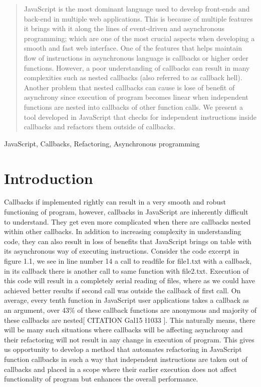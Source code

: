 \documentclass[10pt,conference]{IEEEtran}
\begin{document}
\begin{abstract}
JavaScript is the most dominant language used to develop front-ends and back-end in multiple web applications. This is because of multiple features it brings with it along the lines of event-driven and asynchronous programming; which are one of the most crucial aspects when developing a smooth and fast web interface. One of the features that helps maintain flow of instructions in asynchronous language is callbacks or higher order functions. However, a poor understanding of callbacks can result in many complexities such as nested callbacks (also referred to as callback hell). Another problem that nested callbacks can cause is lose of benefit of asynchrony since execution of program becomes linear when independent functions are nested into callbacks of other function calls. We present a tool developed in JavaScript that checks for independent instructions inside callbacks and refactors them outside of callbacks.
\end{abstract}

\begin{IEEEkeywords}
JavaScript, Callbacks, Refactoring, Asynchronous programming
\end{IEEEkeywords}

\section{Introduction}
Callbacks if implemented rightly can result in a very smooth and robust functioning of program, however, callbacks in JavaScript are inherently difficult to understand. They get even more complicated when there are callbacks nested within other callbacks. In addition to increasing complexity in understanding code, they can also result in loss of benefits that JavaScript brings on table with its asynchronous way of executing instructions. Consider the code excerpt in figure 1.1, we see in line number 14 a call to readfile for file1.txt with a callback, in its callback there is another call to same function with file2.txt. Execution of this code will result in a completely serial reading of files, where as we could have achieved better results if second call was outside the callback of first call.
On average, every tenth function in JavaScript user applications takes a callback as an argument, over 43\% of these callback functions are anonymous and majority of these callbacks are nested[ CITATION Gal15 \l 1033 ]. This naturally means, there will be many such situations where callbacks will be affecting asynchrony and their refactoring will not result in any change in execution of program. This gives us opportunity to develop a method that automates refactoring in JavaScript function callbacks in such a way that independent instructions are taken out of callbacks and placed in a scope where their earlier execution does not affect functionality of program but enhances the overall performance.
\end{document}
